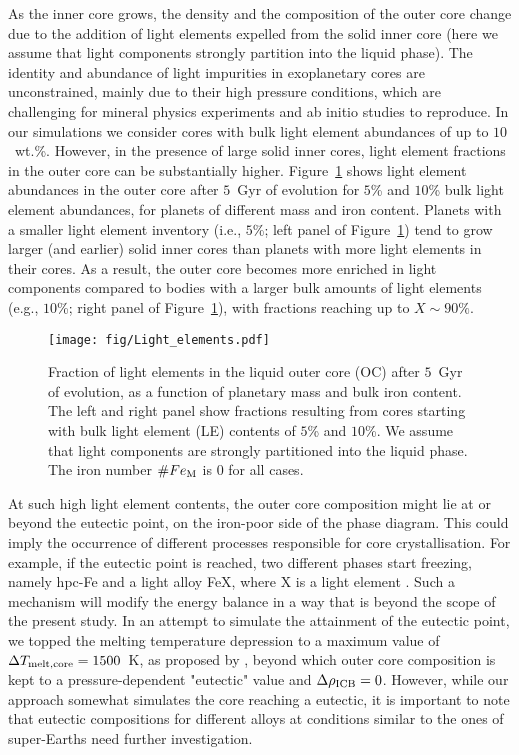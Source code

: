 \documentclass[draft]{agujournal2019} %
\begin{document}
As the inner core grows, the density and the composition of the outer core change due to the addition of light elements expelled from the solid inner core (here we assume that light components strongly partition into the liquid phase). The identity and abundance of light impurities in exoplanetary cores are unconstrained, mainly due to their high pressure conditions, which are challenging for mineral physics experiments and ab initio studies to reproduce. In our simulations we consider cores with bulk light element abundances of up to $10$~wt.\%. However, in the presence of large solid inner cores, light element fractions in the outer core can be substantially higher. Figure~\ref{fig:Light_elements} shows light element abundances in the outer core after $5$~Gyr of evolution for $5$\% and $10$\% bulk light element abundances, for planets of different mass and iron content. Planets with a smaller light element inventory (i.e., $5$\%; left panel of Figure~\ref{fig:Light_elements}) tend to grow larger (and earlier) solid inner cores than planets with more light elements in their cores. As a result, the outer core becomes more enriched in light components compared to bodies with a larger bulk amounts of light elements (e.g., $10$\%; right panel of Figure~\ref{fig:Light_elements}), with fractions reaching up to $X\sim90\%$. 

\begin{figure}
\texttt{[image: fig/Light\_elements.pdf]}
\caption{Fraction of light elements in the liquid outer core (OC) after $5$~Gyr of evolution, as a function of planetary mass and bulk iron content. The left and right panel show fractions resulting from cores starting with bulk light element (LE) contents of $5$\% and $10$\%. We assume that light components are strongly partitioned into the liquid phase. The iron number $\# Fe_{\rm M}$ is $0$ for all cases.}
\label{fig:Light_elements}
\end{figure}

At such high light element contents, the outer core composition might lie at or beyond the eutectic point, on the iron-poor side of the phase diagram. This could imply the occurrence of different processes responsible for core crystallisation. For example, if the eutectic point is reached, two different phases start freezing, namely hpc-Fe and a light alloy FeX, where X is a light element \cite{braginsky1963structure}. Such a mechanism will modify the energy balance in a way that is beyond the scope of the present study. In an attempt to simulate the attainment of the eutectic point, we topped the melting temperature depression to a maximum value of $\Delta T_{\rm melt,core}=1500$~K, as proposed by , beyond which outer core composition is kept to a pressure-dependent "eutectic" value and $\Delta \rho_{\rm ICB}=0$. However, while our approach somewhat simulates the core reaching a eutectic, it is important to note that eutectic compositions for different alloys at conditions similar to the ones of super-Earths need further investigation.
\end{document}
